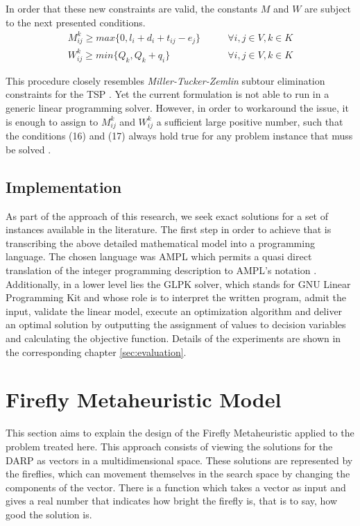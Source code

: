 \documentclass[tuberlin,cic,tc,openright,english,noabntcite,oneside]{iiufrgs}
\begin{document}
In order that these new constraints are valid, the constants $M$ and $W$ are subject to the next presented conditions.
\begin{align}
	M_{ij}^k \geq max\{0, l_i+d_i+t_{ij} - e_j\}	\qquad & \forall i,j \in V, k \in K \\
	W_{ij}^k \geq min\{Q_k, Q_k+q_i\}				\qquad & \forall i,j \in V, k \in K
\end{align}

This procedure closely resembles \emph{Miller-Tucker-Zemlin} subtour elimination constraints for the TSP \parencite[p. 575]{cordeau_branch-and-cut_2006}. Yet the current formulation is not able to run in a generic linear programming solver. However, in order to workaround the issue, it is enough to assign to $M_{ij}^k$ and $W_{ij}^k$ a sufficient large positive number, such that the conditions (16) and (17) always hold true for any problem instance that muss be solved \parencite[p. 44]{hall_integrated_2009}.

\subsection{Implementation}
As part of the approach of this research, we seek exact solutions for a set of instances available in the literature. The first step in order to achieve that is transcribing the above detailed mathematical model into a programming language. The chosen language was AMPL which permits a quasi direct translation of the integer programming description to AMPL's notation \parencite[p. 520]{fourer_modeling_1990}. Additionally, in a lower level lies the GLPK solver, which stands for GNU Linear Programming Kit and whose role is to interpret the written program, admit the input, validate the linear model, execute an optimization algorithm and deliver an optimal solution by outputting the assignment of values to decision variables and calculating the objective function. Details of the experiments are shown in the corresponding chapter \ref{sec:evaluation}.

\section{Firefly Metaheuristic Model}
This section aims to explain the design of the Firefly Metaheuristic applied to the problem treated here. This approach consists of viewing the solutions for the DARP as vectors in a multidimensional space. These solutions are represented by the fireflies, which can movement themselves in the search space by changing the components of the vector. There is a function which takes a vector as input and gives a real number that indicates how bright the firefly is, that is to say, how good the solution is.
\end{document}
